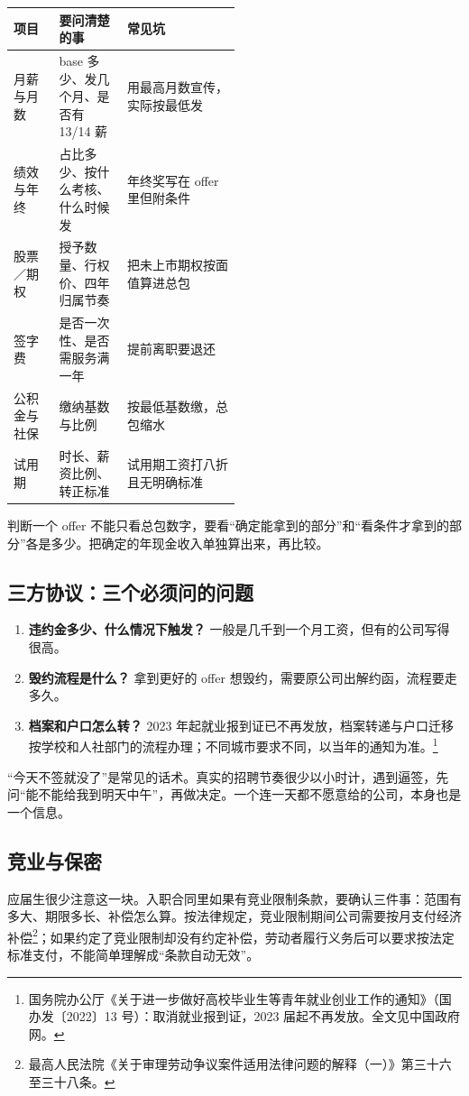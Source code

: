 \documentclass[UTF8,zihao=5,openany]{ctexbook}
\begin{document}
\begin{center}\small
\begin{tabularx}{\linewidth}{p{0.20\linewidth}p{0.30\linewidth}Y}
\toprule
项目 & 要问清楚的事 & 常见坑 \\
\midrule
月薪与月数 & base 多少、发几个月、是否有 13/14 薪 & 用最高月数宣传，实际按最低发 \\
绩效与年终 & 占比多少、按什么考核、什么时候发 & 年终奖写在 offer 里但附条件 \\
股票／期权 & 授予数量、行权价、四年归属节奏 & 把未上市期权按面值算进总包 \\
签字费 & 是否一次性、是否需服务满一年 & 提前离职要退还 \\
公积金与社保 & 缴纳基数与比例 & 按最低基数缴，总包缩水 \\
试用期 & 时长、薪资比例、转正标准 & 试用期工资打八折且无明确标准 \\
\bottomrule
\end{tabularx}
\end{center}

判断一个 offer 不能只看总包数字，要看“确定能拿到的部分”和“看条件才拿到的部分”各是多少。把确定的年现金收入单独算出来，再比较。

\subsection{三方协议：三个必须问的问题}
\begin{enumerate}
\item \textbf{违约金多少、什么情况下触发？} 一般是几千到一个月工资，但有的公司写得很高。
\item \textbf{毁约流程是什么？} 拿到更好的 offer 想毁约，需要原公司出解约函，流程要走多久。
\item \textbf{档案和户口怎么转？} 2023 年起就业报到证已不再发放，档案转递与户口迁移按学校和人社部门的流程办理；不同城市要求不同，以当年的通知为准。\footnote{国务院办公厅《关于进一步做好高校毕业生等青年就业创业工作的通知》（国办发〔2022〕13 号）：取消就业报到证，2023 届起不再发放。全文见中国政府网。}
\end{enumerate}

“今天不签就没了”是常见的话术。真实的招聘节奏很少以小时计，遇到逼签，先问“能不能给我到明天中午”，再做决定。一个连一天都不愿意给的公司，本身也是一个信息。

\subsection{竞业与保密}
应届生很少注意这一块。入职合同里如果有竞业限制条款，要确认三件事：范围有多大、期限多长、补偿怎么算。按法律规定，竞业限制期间公司需要按月支付经济补偿\footnote{最高人民法院《关于审理劳动争议案件适用法律问题的解释（一）》第三十六至三十八条。}；如果约定了竞业限制却没有约定补偿，劳动者履行义务后可以要求按法定标准支付，不能简单理解成“条款自动无效”。
\end{document}
